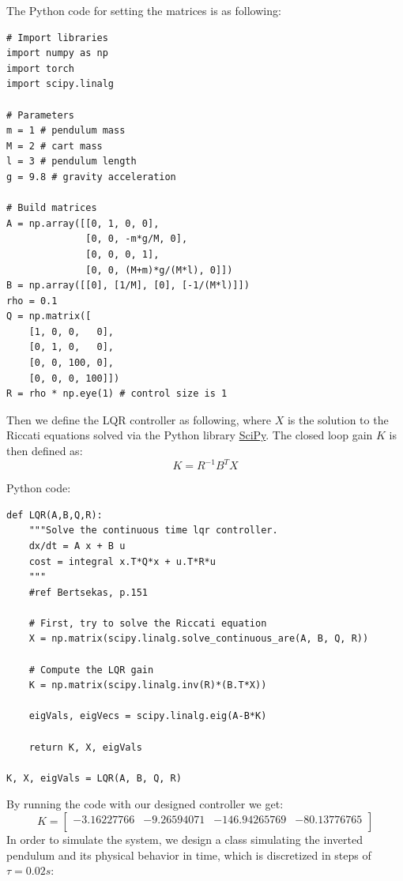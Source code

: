 The Python code for setting the matrices is as following:
\begin{verbatim}
# Import libraries
import numpy as np
import torch
import scipy.linalg

# Parameters
m = 1 # pendulum mass
M = 2 # cart mass
l = 3 # pendulum length
g = 9.8 # gravity acceleration

# Build matrices
A = np.array([[0, 1, 0, 0], 
              [0, 0, -m*g/M, 0],
              [0, 0, 0, 1], 
              [0, 0, (M+m)*g/(M*l), 0]])
B = np.array([[0], [1/M], [0], [-1/(M*l)]])
rho = 0.1
Q = np.matrix([
    [1, 0, 0,   0],
    [0, 1, 0,   0],
    [0, 0, 100, 0],
    [0, 0, 0, 100]])
R = rho * np.eye(1) # control size is 1
\end{verbatim}

Then we define the LQR controller as following, where $X$ is the solution to the Riccati equations solved via the Python library \href{https://www.scipy.org/}{SciPy}. The closed loop gain $K$ is then defined as:
\begin{equation}
    K = R^{-1} B^T X
\end{equation}

Python code:
\begin{verbatim}
def LQR(A,B,Q,R):
    """Solve the continuous time lqr controller.
    dx/dt = A x + B u
    cost = integral x.T*Q*x + u.T*R*u
    """
    #ref Bertsekas, p.151

    # First, try to solve the Riccati equation
    X = np.matrix(scipy.linalg.solve_continuous_are(A, B, Q, R))

    # Compute the LQR gain
    K = np.matrix(scipy.linalg.inv(R)*(B.T*X))

    eigVals, eigVecs = scipy.linalg.eig(A-B*K)

    return K, X, eigVals

K, X, eigVals = LQR(A, B, Q, R)

\end{verbatim}

By running the code with our designed controller we get:
\begin{equation}
    K = \begin{bmatrix}
        -3.16227766  & -9.26594071 &-146.94265769 & -80.13776765\\
    \end{bmatrix}
\end{equation}
In order to simulate the system, we design a class simulating the inverted pendulum and its physical behavior in time, which is discretized in steps of $\tau = 0.02s$:

